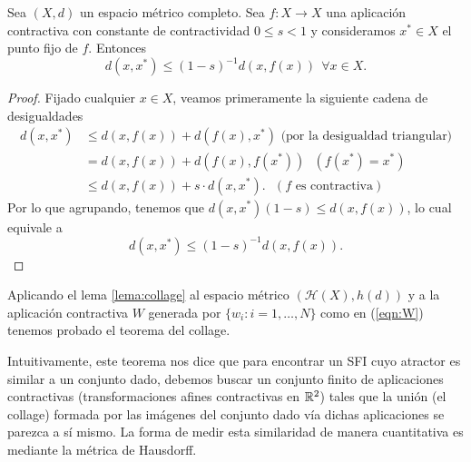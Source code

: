 \begin{lema}
    Sea $(X,d)$ un espacio métrico completo. Sea $f:X\longrightarrow X$ una aplicación contractiva con constante de contractividad $0\leq s < 1$ y consideramos $x^*\in X$ el punto fijo de $f$. Entonces
    $$
    d(x,x^*)\leq (1-s)^{-1} d(x,f(x)) \ \ \forall x\in X.
    $$
    \label{lema:collage}
\end{lema}
\begin{proof}
    Fijado cualquier $x\in X$, veamos primeramente la siguiente cadena de desigualdades
    \begin{equation*}
        \begin{split}
            d(x,x^*) & \leq d(x,f(x)) + d(f(x),x^*) \text{ (por la desigualdad triangular)} \\
            & = d(x,f(x)) + d(f(x),f(x^*)) \ \ \ (f(x^*)=x^*) \\
            & \leq d(x,f(x)) + s \cdot d(x,x^*). \ \ \ (f \text{ es contractiva})
        \end{split}
    \end{equation*}
    Por lo que agrupando, tenemos que $d(x,x^*)(1-s)\leq d(x,f(x))$, lo cual equivale a
    $$
    d(x,x^*)\leq (1-s)^{-1} d(x,f(x)).
    $$
\end{proof}

Aplicando el lema \ref{lema:collage} al espacio métrico $(\mathcal{H}(X), h(d))$ y a la aplicación contractiva $W$ generada por $\{w_i:i=1,\dots,N\}$ como en (\ref{eqn:W}) tenemos probado el teorema del collage.

Intuitivamente, este teorema nos dice que para encontrar un SFI cuyo atractor es similar a un conjunto dado, debemos buscar un conjunto finito de aplicaciones contractivas (transformaciones afines contractivas en $\mathbb{R}^2$) tales que la unión (el collage) formada por las imágenes del conjunto dado vía dichas aplicaciones se parezca a sí mismo. La forma de medir esta similaridad de manera cuantitativa es mediante la métrica de Hausdorff.

